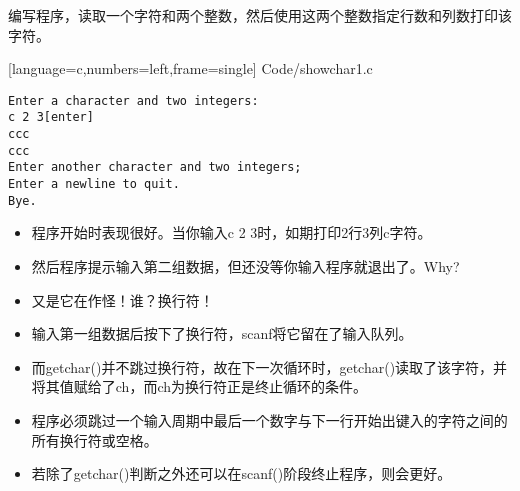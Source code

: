 \begin{frame}[fragile]
编写程序，读取一个字符和两个整数，然后使用这两个整数指定行数和列数打印该字符。
\end{frame}

\begin{frame}

[language=c,numbers=left,frame=single]
{Code/showchar1.c}
\end{frame}

\begin{frame}[fragile]
\begin{lstlisting}
Enter a character and two integers:
c 2 3[enter]
ccc
ccc
Enter another character and two integers;
Enter a newline to quit.
Bye.
\end{lstlisting}
\end{frame}

\begin{frame}[fragile]
\begin{itemize}
\item
程序开始时表现很好。当你输入c 2 3时，如期打印2行3列c字符。\\[0.1in]
\item
然后程序提示输入第二组数据，但还没等你输入程序就退出了。Why? \pause \\[0.1in]
\item[] 又是它在作怪！\pause 谁？\pause 换行符！ \pause \\[0.1in]
\item 
输入第一组数据后按下了换行符，scanf将它留在了输入队列。
\\[0.1in]
\item[] 而{\tf getchar()}并不跳过换行符，故在下一次循环时，{\tf getchar()}读取了该字符，并将其值赋给了ch，而ch为换行符正是终止循环的条件。
\end{itemize}
\end{frame}

\begin{frame}[fragile]
\begin{itemize}
\item
程序必须跳过一个输入周期中最后一个数字与下一行开始出键入的字符之间的所有换行符或空格。 \\[0.1in]
\item
若除了{\tf getchar()}判断之外还可以在{\tf scanf()}阶段终止程序，则会更好。
\end{itemize}
\end{frame}

